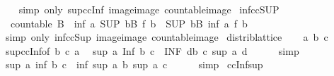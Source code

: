 \begin{isabellebody}
%
\isadelimproof
\ \ %
\endisadelimproof
%
\isatagproof
{}\isamarkupfalse%
\ {\isacharparenleft}simp\ only{\isacharcolon}\ sup{\isacharunderscore}ccInf\ image{\isacharunderscore}image\ countable{\isacharunderscore}image{\isacharparenright}%
\endisatagproof
{\isafoldproof}%
%
\isadelimproof
\isanewline
%
\endisadelimproof
\isanewline
{}\isamarkupfalse%
\ inf{\isacharunderscore}ccSUP{\isacharcolon}\isanewline
\ \ {\isachardoublequoteopen}countable\ B\ {\isasymLongrightarrow}\ inf\ a\ {\isacharparenleft}SUP\ b{\isacharcolon}B{\isachardot}\ f\ b{\isacharparenright}\ {\isacharequal}\ {\isacharparenleft}SUP\ b{\isacharcolon}B{\isachardot}\ inf\ a\ {\isacharparenleft}f\ b{\isacharparenright}{\isacharparenright}{\isachardoublequoteclose}\isanewline
%
\isadelimproof
\ \ %
\endisadelimproof
%
\isatagproof
{}\isamarkupfalse%
\ {\isacharparenleft}simp\ only{\isacharcolon}\ inf{\isacharunderscore}ccSup\ image{\isacharunderscore}image\ countable{\isacharunderscore}image{\isacharparenright}%
\endisatagproof
{\isafoldproof}%
%
\isadelimproof
\isanewline
%
\endisadelimproof
\isanewline
{}\isamarkupfalse%
\ distrib{\isacharunderscore}lattice\isanewline
%
\isadelimproof
%
\endisadelimproof
%
\isatagproof
{}\isamarkupfalse%
\isanewline
\ \ \isamarkupfalse%
\ a\ b\ c\isanewline
\ \ \isamarkupfalse%
\ sup{\isacharunderscore}ccInf{\isacharbrackleft}of\ {\isachardoublequoteopen}{\isacharbraceleft}b{\isacharcomma}\ c{\isacharbraceright}{\isachardoublequoteclose}\ a{\isacharbrackright}\ \isamarkupfalse%
\ {\isachardoublequoteopen}sup\ a\ {\isacharparenleft}Inf\ {\isacharbraceleft}b{\isacharcomma}\ c{\isacharbraceright}{\isacharparenright}\ {\isacharequal}\ {\isacharparenleft}INF\ d{\isacharcolon}{\isacharbraceleft}b{\isacharcomma}\ c{\isacharbraceright}{\isachardot}\ sup\ a\ d{\isacharparenright}{\isachardoublequoteclose}\isanewline
\ \ \ \ \isamarkupfalse%
\ simp\isanewline
\ \ \isamarkupfalse%
\ \isamarkupfalse%
\ {\isachardoublequoteopen}sup\ a\ {\isacharparenleft}inf\ b\ c{\isacharparenright}\ {\isacharequal}\ inf\ {\isacharparenleft}sup\ a\ b{\isacharparenright}\ {\isacharparenleft}sup\ a\ c{\isacharparenright}{\isachardoublequoteclose}\isanewline
\ \ \ \ \isamarkupfalse%
\ simp\isanewline
{}\isamarkupfalse%
%
\endisatagproof
{\isafoldproof}%
%
\isadelimproof
\isanewline
%
\endisadelimproof
\isanewline
{}\isamarkupfalse%
\ ccInf{\isacharunderscore}sup{\isacharcolon}\isanewline

\end{isabellebody}
